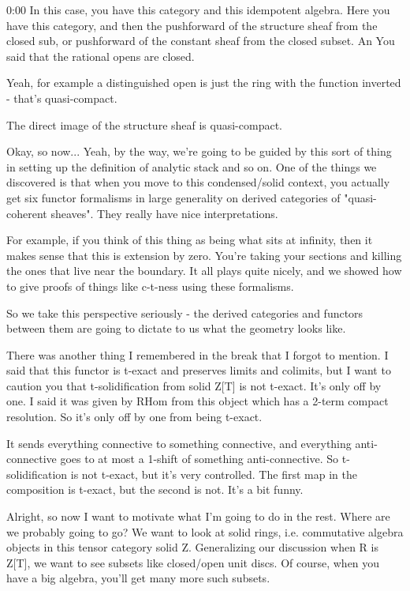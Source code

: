 \begin{unfinished}{0:00}
In this case, you have this category and this idempotent algebra. Here you have this category, and then the pushforward of the structure sheaf from the closed sub, or pushforward of the constant sheaf from the closed subset. An
You said that the rational opens are closed.

Yeah, for example a distinguished open is just the ring with the function inverted - that's quasi-compact.

The direct image of the structure sheaf is quasi-compact.

Okay, so now... Yeah, by the way, we're going to be guided by this sort of thing in setting up the definition of analytic stack and so on. One of the things we discovered is that when you move to this condensed/solid context, you actually get six functor formalisms in large generality on derived categories of "quasi-coherent sheaves". They really have nice interpretations.

For example, if you think of this thing as being what sits at infinity, then it makes sense that this is extension by zero. You're taking your sections and killing the ones that live near the boundary. It all plays quite nicely, and we showed how to give proofs of things like c-t-ness using these formalisms.

So we take this perspective seriously - the derived categories and functors between them are going to dictate to us what the geometry looks like.

There was another thing I remembered in the break that I forgot to mention. I said that this functor is t-exact and preserves limits and colimits, but I want to caution you that t-solidification from solid Z[T] is not t-exact. It's only off by one. I said it was given by RHom from this object which has a 2-term compact resolution. So it's only off by one from being t-exact.

It sends everything connective to something connective, and everything anti-connective goes to at most a 1-shift of something anti-connective. So t-solidification is not t-exact, but it's very controlled. The first map in the composition is t-exact, but the second is not. It's a bit funny.

Alright, so now I want to motivate what I'm going to do in the rest. Where are we probably going to go? We want to look at solid rings, i.e. commutative algebra objects in this tensor category solid Z. Generalizing our discussion when R is Z[T], we want to see subsets like closed/open unit discs. Of course, when you have a big algebra, you'll get many more such subsets.


\end{unfinished}
